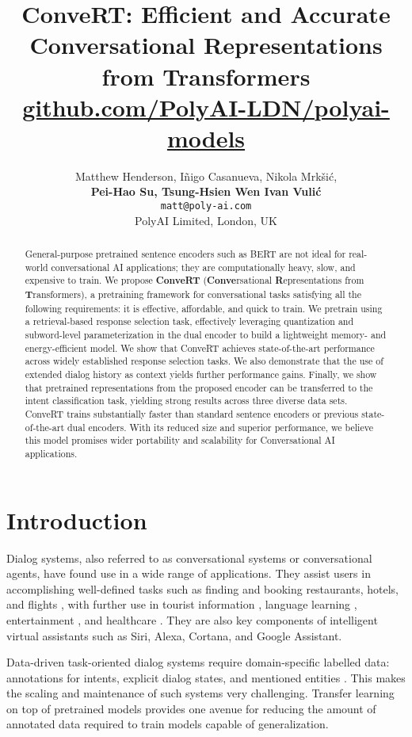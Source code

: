 \documentclass[11pt,a4paper]{article}
\title{
ConveRT: Efficient and Accurate \\ Conversational Representations from Transformers
\\
{
        \ttfamily \small \href{https://github.com/PolyAI-LDN/polyai-models}{github.com/PolyAI-LDN/polyai-models}
}
}
\author{
 Matthew Henderson,
 I{\~{n}}igo Casanueva,
 Nikola Mrk{\v{s}}i\'c, \\
 {\bf 
 Pei-Hao Su, Tsung-Hsien Wen \normalfont{and}
 \textbf{Ivan Vuli\'{c}}
 } \\
 \texttt{\small matt@poly-ai.com} \\
 PolyAI Limited,
 London, UK
}
\date{}
\begin{document}
\maketitle
\begin{abstract}
General-purpose pretrained sentence encoders such as BERT are not ideal for real-world conversational AI applications; they are computationally heavy, slow, and expensive to train. We propose \textbf{ConveRT} (\textbf{Conve}rsational \textbf{R}epresentations from \textbf{T}ransformers), a pretraining framework for conversational tasks satisfying all the following requirements: it is effective, affordable, and quick to train. We pretrain using a retrieval-based response selection task, effectively leveraging quantization and subword-level parameterization in the dual encoder to build a lightweight memory- and energy-efficient model. We show that ConveRT achieves state-of-the-art performance across widely established response selection tasks. We also demonstrate that the use of extended dialog history as context yields further performance gains. Finally, we show that pretrained representations from the proposed encoder can be transferred to the intent classification task, yielding strong results across three diverse data sets. {ConveRT} trains substantially faster than standard sentence encoders or previous state-of-the-art dual encoders. With its reduced size and superior performance, we believe this model promises wider portability and scalability for Conversational AI applications. \end{abstract}

\section{Introduction}
\label{s:intro}
Dialog systems, also referred to as conversational systems or conversational agents, have found use in a wide range of applications. They assist users in accomplishing well-defined tasks such as finding and booking restaurants, hotels, and flights \cite{Hemphill:1990,Williams:2012b,ElAsri:2017sigdial}, with further use in tourist information \cite{Budzianowski:2018emnlp}, language learning \cite{Raux:2003,Chen:2017survey}, entertainment \cite{Fraser:2018iva}, and  healthcare \cite{Laranjo:2018,Fadhil:2019arxiv}. They are also key components of intelligent virtual assistants such as Siri, Alexa, Cortana, and Google Assistant.

Data-driven task-oriented dialog systems require domain-specific labelled data: annotations for intents, explicit dialog states, and mentioned entities \cite{Williams:2014sigdial,Wen:17,Wen:2017icml,Ramadan:2018acl,Liu:2018naacl,Zhao:2019naacl}. This makes the scaling and maintenance of such systems very challenging. Transfer learning on top of pretrained models \cite[\textit{inter alia}]{Devlin:2018arxiv,Liu:2019roberta} provides one avenue for reducing the amount of annotated data required to train models capable of generalization.
\end{document}
